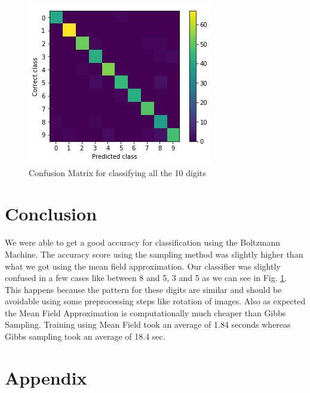 \documentclass{article}
\begin{document}
\begin{figure}[ht]
  \centering
  \includegraphics[width=\textwidth]{confusion}
  \caption{Confusion Matrix for classifying all the 10 digits}
  \label{fig:confusion}
\end{figure}

\section{Conclusion}
We were able to get a good accuracy for classification using the Boltzmann 
Machine. The accuracy score using the sampling method was slightly higher than
what we got using the mean field approximation. Our classifier was slightly 
confused in a few cases like between 8 and 5, 3 and 5 as we can see in Fig. 
\ref{fig:confusion}. This happens because the pattern for these digits are 
similar and should be avoidable using some preprocessing steps like rotation
of images. Also as expected the Mean Field Approximation is computationally 
much cheaper than Gibbs Sampling. Training using Mean Field took an average of
1.84 seconds whereas Gibbs sampling took an average of 18.4 sec.

\section{Appendix}
\end{document}

